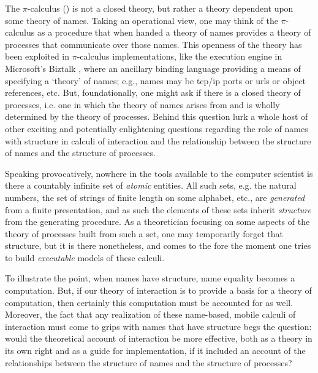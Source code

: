 \documentclass[]{entcs}
\newcommand{\pic}{$\pi$-calculus}
\begin{document}
The {\pic} (\cite{milner91polyadicpi}) is not a closed theory, but
rather a theory dependent upon some theory of names. Taking an
operational view, one may think of the {\pic} as a procedure that when
handed a theory of names provides a theory of processes that
communicate over those names. This openness of the theory has been
exploited in {\pic} implementations, like the execution engine in
Microsoft's Biztalk \cite{biztalk}, where an ancillary binding
language providing a means of specifying a `theory' of names; e.g.,
names may be tcp/ip ports or urls or object references, etc. But,
foundationally, one might ask if there is a closed theory of
processes, i.e. one in which the theory of names arises from and is
wholly determined by the theory of processes. Behind this question
lurk a whole host of other exciting and potentially enlightening
questions regarding the role of names with structure in calculi of
interaction and the relationship between the structure of names and
the structure of processes.

Speaking provocatively, nowhere in the tools available to the computer
scientist is there a countably infinite set of \textit{atomic}
entities. All such sets, e.g. the natural numbers, the set of strings
of finite length on some alphabet, etc., are \textit{generated} from a
finite presentation, and as such the elements of these sets inherit
\textit{structure} from the generating procedure. As a theoretician
focusing on some aspects of the theory of processes built from such a
set, one may temporarily forget that structure, but it is there
nonetheless, and comes to the fore the moment one tries to build
\textit{executable} models of these calculi. 

To illustrate the point, when names have structure, name equality
becomes a computation. But, if our theory of interaction is to provide
a basis for a theory of computation, then certainly this computation
must be accounted for as well. Moreover, the fact that any realization
of these name-based, mobile calculi of interaction must come to grips
with names that have structure begs the question: would the
theoretical account of interaction be more effective, both as a theory
in its own right and as a guide for implementation, if it included an
account of the relationships between the structure of names and the
structure of processes?
\end{document}
